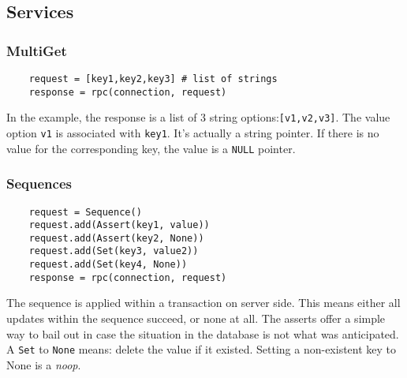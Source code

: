\documentclass{article}
\begin{document}
\subsection{Services}
\subsubsection{MultiGet}
  \begin{lstlisting}
    request = [key1,key2,key3] # list of strings
    response = rpc(connection, request)
  \end{lstlisting}

In the example, the response is a list of 3 string options:\texttt{[v1,v2,v3]}.
The value option \texttt{v1} is associated with \texttt{key1}.
It's actually a string pointer.
If there is no value for the corresponding key,
the value is a \texttt{NULL} pointer.
\subsubsection{Sequences}
  \begin{lstlisting}
    request = Sequence()
    request.add(Assert(key1, value))
    request.add(Assert(key2, None))
    request.add(Set(key3, value2))
    request.add(Set(key4, None))
    response = rpc(connection, request)
  \end{lstlisting}
  The sequence is applied within a transaction on server side.
  This means either all updates within the sequence succeed, or none at all.
  The asserts offer a simple way to bail out in case the situation in the database is not what was anticipated.
A \texttt{Set} to \texttt{None} means: delete the value if it existed.
Setting a non-existent key to None is a \emph{noop}.
\end{document}
